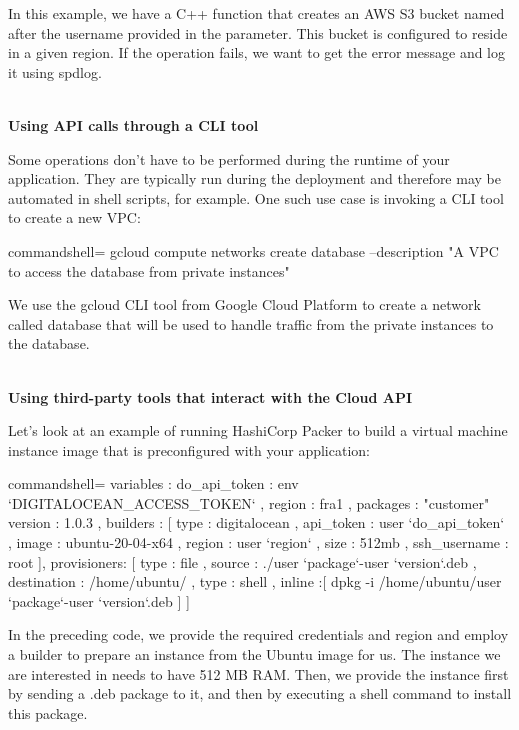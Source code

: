 In this example, we have a C++ function that creates an AWS S3 bucket named after the username provided in the parameter. This bucket is configured to reside in a given region. If the operation fails, we want to get the error message and log it using spdlog.

\hspace*{\fill} \\ %
\noindent
\textbf{Using API calls through a CLI tool}

Some operations don't have to be performed during the runtime of your application. They are typically run during the deployment and therefore may be automated in shell scripts, for example. One such use case is invoking a CLI tool to create a new VPC: 

\begin{tcblisting}{commandshell={}}
gcloud compute networks create database --description "A VPC to access the database from private instances"
\end{tcblisting}

We use the gcloud CLI tool from Google Cloud Platform to create a network called database that will be used to handle traffic from the private instances to the database.

\hspace*{\fill} \\ %
\noindent
\textbf{Using third-party tools that interact with the Cloud API}

Let's look at an example of running HashiCorp Packer to build a virtual machine instance image that is preconfigured with your application:

\begin{tcblisting}{commandshell={}}
{
  variables : {
    do_api_token : {{env `DIGITALOCEAN_ACCESS_TOKEN`}} ,
    region : fra1 ,
    packages : "customer"
    version : 1.0.3
  },
  builders : [
    {
      type : digitalocean ,
      api_token : {{user `do_api_token`}} ,
      image : ubuntu-20-04-x64 ,
      region : {{user `region`}} ,
      size : 512mb ,
      ssh_username : root
    }
  ],
  provisioners: [
    {
      type : file ,
      source : ./{{user `package`}}-{{user `version`}}.deb ,
      destination : /home/ubuntu/
    },
    {
      type : shell ,
      inline :[
        dpkg -i /home/ubuntu/{{user `package`}}-{{user `version`}}.deb
      ]
    }
  ]
}
\end{tcblisting}

In the preceding code, we provide the required credentials and region and employ a builder to prepare an instance from the Ubuntu image for us. The instance we are interested in needs to have 512 MB RAM. Then, we provide the instance first by sending a .deb package to it, and then by executing a shell command to install this package.

